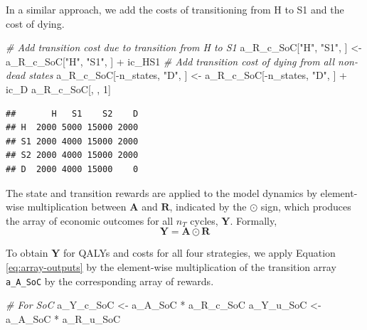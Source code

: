 \documentclass[
]{article}
\newenvironment{Shaded}{\begin{snugshade}}{\end{snugshade}}
\newcommand{\CommentTok}[1]{\textcolor[rgb]{0.56,0.35,0.01}{\textit{#1}}}
\newcommand{\DecValTok}[1]{\textcolor[rgb]{0.00,0.00,0.81}{#1}}
\newcommand{\NormalTok}[1]{#1}
\newcommand{\OtherTok}[1]{\textcolor[rgb]{0.56,0.35,0.01}{#1}}
\newcommand{\SpecialCharTok}[1]{\textcolor[rgb]{0.00,0.00,0.00}{#1}}
\newcommand{\StringTok}[1]{\textcolor[rgb]{0.31,0.60,0.02}{#1}}
\begin{document}
In a similar approach, we add the costs of transitioning from H to S1 and the cost of dying.

\begin{Shaded}
\begin{Highlighting}[]
\CommentTok{\# Add transition cost due to transition from H to S1}
\NormalTok{a\_R\_c\_SoC[}\StringTok{"H"}\NormalTok{, }\StringTok{"S1"}\NormalTok{, ] }\OtherTok{\textless{}{-}}\NormalTok{ a\_R\_c\_SoC[}\StringTok{"H"}\NormalTok{, }\StringTok{"S1"}\NormalTok{, ] }\SpecialCharTok{+}\NormalTok{ ic\_HS1}
\CommentTok{\# Add transition cost of dying from all non{-}dead states}
\NormalTok{a\_R\_c\_SoC[}\SpecialCharTok{{-}}\NormalTok{n\_states, }\StringTok{"D"}\NormalTok{, ] }\OtherTok{\textless{}{-}}\NormalTok{ a\_R\_c\_SoC[}\SpecialCharTok{{-}}\NormalTok{n\_states, }\StringTok{"D"}\NormalTok{, ] }\SpecialCharTok{+}\NormalTok{ ic\_D}
\NormalTok{a\_R\_c\_SoC[, , }\DecValTok{1}\NormalTok{]}
\end{Highlighting}
\end{Shaded}

\begin{verbatim}
##       H   S1    S2    D
## H  2000 5000 15000 2000
## S1 2000 4000 15000 2000
## S2 2000 4000 15000 2000
## D  2000 4000 15000    0
\end{verbatim}

The state and transition rewards are applied to the model dynamics by element-wise multiplication between \(\mathbf{A}\) and \(\mathbf{R}\), indicated by the \(\odot\) sign, which produces the array of economic outcomes for all \(n_T\) cycles, \(\mathbf{Y}\). Formally,
\begin{equation}
  \mathbf{Y} = \mathbf{A} \odot \mathbf{R}
  \label{eq:array-outputs}
\end{equation}

To obtain \(\mathbf{Y}\) for QALYs and costs for all four strategies, we apply Equation \eqref{eq:array-outputs} by the element-wise multiplication of the transition array \texttt{a\_A\_SoC} by the corresponding array of rewards.

\begin{Shaded}
\begin{Highlighting}[]
\CommentTok{\# For SoC}
\NormalTok{a\_Y\_c\_SoC }\OtherTok{\textless{}{-}}\NormalTok{ a\_A\_SoC }\SpecialCharTok{*}\NormalTok{ a\_R\_c\_SoC}
\NormalTok{a\_Y\_u\_SoC }\OtherTok{\textless{}{-}}\NormalTok{ a\_A\_SoC }\SpecialCharTok{*}\NormalTok{ a\_R\_u\_SoC}
\end{Highlighting}
\end{Shaded}
\end{document}
